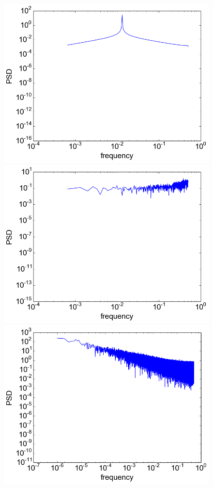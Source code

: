\documentclass[12pt]{article}
\begin{document}
\begin{figure}\label{fig:stack_ts_spectra}
  \begin{center}
    \includegraphics[scale=0.6]{spectrum_sinusoid}
    \includegraphics[scale=0.6]{spectrum_logistic}
    \includegraphics[scale=0.6]{spectrum_fbm}

\end{center}
\end{figure}
\end{document}
